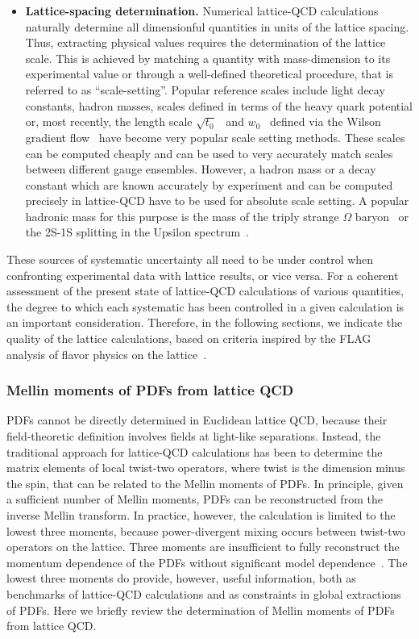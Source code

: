 \begin{itemize}
\item {\bfseries Lattice-spacing determination.} 
Numerical lattice-QCD calculations 
naturally determine all dimensionful quantities in units of the
lattice spacing. Thus, extracting physical values requires the
determination of the lattice scale. This is achieved by matching a
quantity with mass-dimension to its experimental value or through a
well-defined theoretical procedure, that is referred to as
``scale-setting''. Popular reference scales include light decay
constants, hadron masses, scales defined in terms of the heavy quark
potential or, most recently, the length scale $\sqrt{t_0}$~\cite{Luscher:2010iy} and $w_0$~\cite{Borsanyi:2012zs} defined via the Wilson 
gradient flow~\cite{Luscher:2010iy} have become very popular scale setting methods. These scales can be computed cheaply and can be used to very accurately
match scales between different gauge ensembles.  However, a hadron mass or a decay constant which are known accurately by experiment and can be computed precisely in lattice-QCD have to be used for absolute scale setting. A popular hadronic mass for this purpose is the mass of the triply strange $\Omega$ baryon~\cite{Durr:2008zz} or the 2S-1S splitting in the Upsilon spectrum~\cite{Kendall:2008zz}.

\end{itemize}

These sources of systematic uncertainty all need to be under control
when confronting experimental data with lattice results, or vice
versa.
%
For a coherent assessment of the present state of lattice-QCD
calculations of various quantities, the degree to which each
systematic has been controlled in a given calculation is an important
consideration.
%
Therefore, in the following sections, we indicate the
quality of the lattice calculations, based on criteria inspired by the
FLAG analysis of flavor physics on the lattice~\cite{Aoki:2016frl}.

\subsubsection{Mellin moments of PDFs from lattice QCD}
\label{Sec:MomentsLQCD}

PDFs cannot be directly determined in Euclidean lattice QCD, because their 
field-theoretic definition involves fields at light-like separations.
%
Instead, 
the traditional approach for lattice-QCD calculations has been to determine the matrix elements of local twist-two operators, where twist is the dimension minus the spin, that can be related to the Mellin moments of PDFs.
%
In principle, given a sufficient number of Mellin moments, PDFs can be reconstructed from the inverse Mellin transform. In practice, however, the calculation is limited to the lowest three moments, because power-divergent mixing occurs between twist-two operators on the lattice.
%
Three moments are insufficient to fully reconstruct the momentum dependence of the PDFs without significant model dependence~\cite{Detmold:2003rq}.
%
The lowest three moments do provide, however, useful information, both as benchmarks of lattice-QCD calculations and as constraints in global extractions of PDFs. Here we briefly review the determination of Mellin moments of PDFs from lattice QCD. 

